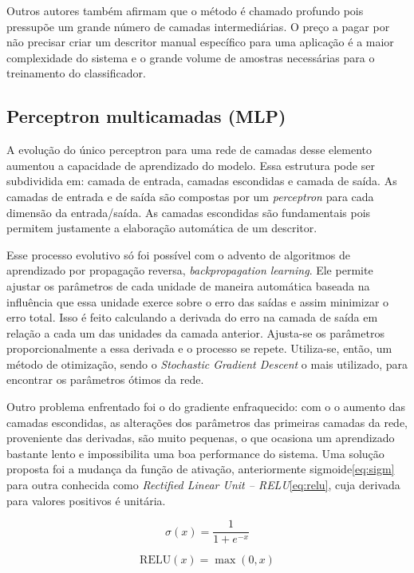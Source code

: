 Outros autores também afirmam que o método é chamado profundo pois pressupõe um grande número de camadas intermediárias. O preço a pagar por não precisar criar um descritor manual específico para uma aplicação é a maior complexidade do sistema e o grande volume de amostras necessárias para o treinamento do classificador.

\subsection{Perceptron multicamadas (MLP)}
A evolução do único perceptron para uma rede de camadas desse elemento aumentou a capacidade de aprendizado do modelo. Essa estrutura pode ser subdividida em: camada de entrada, camadas escondidas e camada de saída. As camadas de entrada e de saída são compostas por um \textit{perceptron} para cada dimensão da entrada/saída. As camadas escondidas são fundamentais pois permitem justamente a elaboração automática de um descritor.

Esse processo evolutivo só foi possível com o advento de algoritmos de aprendizado por propagação reversa, \textit{backpropagation learning}. Ele  permite ajustar os parâmetros de cada unidade de maneira automática baseada na influência que essa unidade exerce sobre o erro das saídas e assim minimizar o erro total. Isso é feito calculando a derivada do erro na camada de saída em relação a cada um das unidades da camada anterior. Ajusta-se os parâmetros proporcionalmente a essa derivada e o processo se repete. Utiliza-se, então, um método de otimização, sendo o \textit{Stochastic Gradient Descent} o mais utilizado, para encontrar os parâmetros ótimos da rede.

Outro problema enfrentado foi o do gradiente enfraquecido: com o o aumento das camadas escondidas, as alterações dos parâmetros das primeiras camadas da rede, proveniente das derivadas, são muito pequenas, o que ocasiona um aprendizado bastante lento e impossibilita uma boa performance do sistema. Uma solução proposta foi a mudança da função de ativação, anteriormente sigmoide\ref{eq:sigm} para outra conhecida como \textit{Rectified Linear Unit -- RELU}\ref{eq:relu}, cuja derivada para valores positivos é unitária. 

\begin{equation}
	\label{eq:sigm}
	\sigma(x) = \frac{1}{1+e^{-x}}
\end{equation}

\begin{equation}
	\label{eq:relu}
	\text{RELU}(x) = \max(0,x)
\end{equation}

